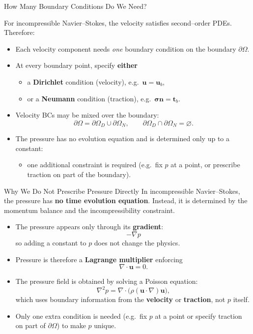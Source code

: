 \documentclass[aspectratio=169]{beamer}
\begin{document}
\begin{frame}{How Many Boundary Conditions Do We Need?}

For incompressible Navier--Stokes, the velocity satisfies
second--order PDEs. Therefore:

\begin{itemize}
  \item Each velocity component needs \emph{one} boundary condition
        on the boundary $\partial\Omega$.
  \item At every boundary point, specify \textbf{either}
        \begin{itemize}
           \item a \textbf{Dirichlet} condition (velocity), e.g.\ $\mathbf{u}=\mathbf{u}_b$, \\
           \item or a \textbf{Neumann} condition (traction), e.g.\ $\boldsymbol{\sigma}\mathbf{n}=\mathbf{t}_b$.
        \end{itemize}
  \item Velocity BCs may be mixed over the boundary:
        \[
        \partial\Omega
        = \partial\Omega_D \cup \partial\Omega_N,
        \qquad
        \partial\Omega_D \cap \partial\Omega_N = \varnothing.
        \]
  \item The pressure has no evolution equation and is determined only up to a constant:
        \begin{itemize}
           \item one additional constraint is required (e.g.\ fix $p$ at a point, or prescribe traction on part of the boundary).
        \end{itemize}
\end{itemize}

\end{frame}

\begin{frame}{Why We Do Not Prescribe Pressure Directly}
\footnotesize
In incompressible Navier--Stokes, the pressure has \textbf{no time evolution equation}.
Instead, it is determined by the momentum balance and the incompressibility constraint.

\medskip

\begin{itemize}
  \item The pressure appears only through its \textbf{gradient}:
  \[
    -\nabla p
  \]
  so adding a constant to $p$ does not change the physics.
  \item Pressure is therefore a \textbf{Lagrange multiplier} enforcing
  \[
    \nabla\!\cdot \mathbf{u} = 0.
  \]
  \item The pressure field is obtained by solving a Poisson equation:
  \[
    \nabla^2 p = \nabla\!\cdot\big( \rho(\mathbf{u}\!\cdot\!\nabla)\mathbf{u} \big),
  \]
  which uses boundary information from the \textbf{velocity} or \textbf{traction}, not $p$ itself.
  \item Only one extra condition is needed (e.g.\ fix $p$ at a point or specify traction on part of $\partial\Omega$) to make $p$ unique.
\end{itemize}

\end{frame}
\end{document}
